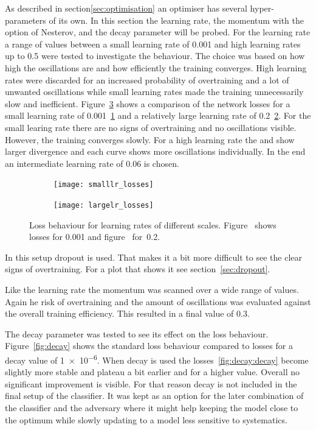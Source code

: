 As described in section\ref{sec:optimisation} an optimiser has several hyper-parameters of its own. In this section the learning rate, the momentum with the option of Nesterov, and the decay parameter will be probed.
For the learning rate a range of values between a small learning rate of \num{0.001} and high learning rates up to \num{0.5} were tested to investigate the behaviour. The choice was based on how high the oscillations are and how efficiently the training converges. High learning rates were discarded for an increased probability of overtraining and a lot of unwanted oscillations while small learning rates made the training unnecessarily slow and inefficient. Figure~\ref{fig:lr} shows a comparison of the network losses for a small learning rate of \num{0.001}~\ref{fig:lr:small} and a relatively large learning rate of \num{0.2}~\ref{fig:lr:large}. For the small learing rate there are no signs of overtraining and no oscillations visible. However, the training converges slowly. For a high learning rate the \losstrain and \losstest show larger divergence and each curve shows more oscillations individually. In the end an intermediate learning rate of \num{0.06} is chosen.

\begin{figure}[htbp]
    \centering
    \begin{subfigure}[b]{0.48\textwidth}
        \texttt{[image: smalllr\_losses]}
        \caption{}
        \label{fig:lr:small}
    \end{subfigure}
\quad
    \begin{subfigure}[b]{0.48\textwidth}
        \texttt{[image: largelr\_losses]}
        \caption{}
        \label{fig:lr:large}
    \end{subfigure}
    \caption{Loss behaviour for learning rates of different scales. Figure~ shows losses for \num{0.001} and figure~ for~\num{0.2}.}
	\label{fig:lr}
\end{figure}

In this setup dropout is used. That makes it a bit more difficult to see the clear signs of overtraining. For a plot that shows it see section~\ref{sec:dropout}.

Like the learning rate the momentum was scanned over a wide range of values. Again he risk of overtraining and the amount of oscillations was evaluated against the overall training efficiency. This resulted in a final value of \num{0.3}.

The decay parameter was tested to see its effect on the loss behaviour. Figure~\ref{fig:decay} shows the standard loss behaviour compared to losses for a decay value of \num{1e-6}. When decay is used the losses~\ref{fig:decay:decay} become slightly more stable and plateau a bit earlier and for a higher value. Overall no significant improvement is visible. For that reason decay is not included in the final setup of the classifier. It was kept as an option for the later combination of the classifier and the adversary where it might help keeping the model close to the optimum while slowly updating to a model less sensitive to systematics.

